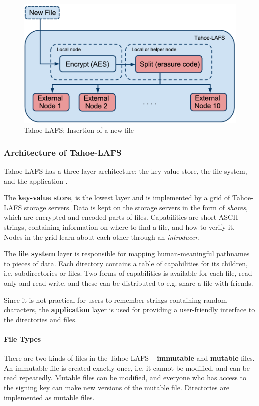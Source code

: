 \documentclass[pdftex,english,10pt,b5paper,twoside]{book}
\begin{document}
\begin{figure}[h!]
    \centering
    \includegraphics[width=\columnwidth]{Tahoe-newfile.pdf}
    \caption{Tahoe-LAFS: Insertion of a new file}
    \label{fig:B:tahoe}
\end{figure}


\subsubsection{Architecture of Tahoe-LAFS}

Tahoe-\ac{LAFS} has a three layer architecture: the key-value store, the file system, and
the application \cite{tahoe}.

The \textbf{key-value store}, is the lowest layer and is implemented by a grid
of Tahoe-LAFS storage servers. Data is kept on the storage servers in the form
of \emph{shares}, which are encrypted and encoded parts of files. Capabilities
are short ASCII strings, containing information on where to find a file, and
how to verify it.  Nodes in the grid learn about each other through an
\emph{introducer}.

The \textbf{file system} layer is responsible for mapping human-meaningful
pathnames to pieces of data. Each directory contains a table of capabilities
for its children, i.e. subdirectories or files. Two forms of capabilities is
available for each file, read-only and read-write, and these can be distributed
to e.g. share a file with friends.

Since it is not practical for users to remember strings containing random
characters, the \textbf{application} layer is used for providing a user-friendly
interface to the directories and files.

\paragraph{File Types} There are two kinds of files in the Tahoe-\ac{LAFS} --
\textbf{immutable} and \textbf{mutable} files. An immutable file is created
exactly once, i.e. it cannot be modified, and can be read repeatedly. Mutable
files can be modified, and everyone who has access to the signing key can make
new versions of the mutable file. Directories are implemented as mutable files.
\end{document}
